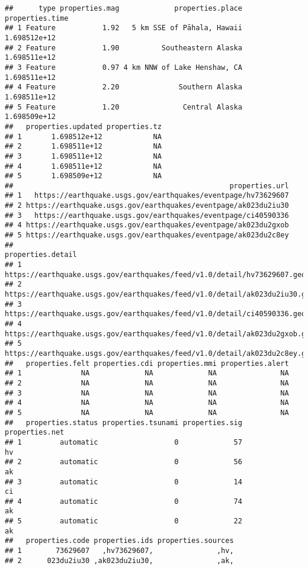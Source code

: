\documentclass[
]{article}
\begin{document}
\begin{verbatim}
##      type properties.mag             properties.place properties.time
## 1 Feature           1.92   5 km SSE of Pāhala, Hawaii    1.698512e+12
## 2 Feature           1.90          Southeastern Alaska    1.698511e+12
## 3 Feature           0.97 4 km NNW of Lake Henshaw, CA    1.698511e+12
## 4 Feature           2.20              Southern Alaska    1.698511e+12
## 5 Feature           1.20               Central Alaska    1.698509e+12
##   properties.updated properties.tz
## 1       1.698512e+12            NA
## 2       1.698511e+12            NA
## 3       1.698511e+12            NA
## 4       1.698511e+12            NA
## 5       1.698509e+12            NA
##                                                   properties.url
## 1   https://earthquake.usgs.gov/earthquakes/eventpage/hv73629607
## 2 https://earthquake.usgs.gov/earthquakes/eventpage/ak023du2iu30
## 3   https://earthquake.usgs.gov/earthquakes/eventpage/ci40590336
## 4 https://earthquake.usgs.gov/earthquakes/eventpage/ak023du2gxob
## 5 https://earthquake.usgs.gov/earthquakes/eventpage/ak023du2c8ey
##                                                               properties.detail
## 1   https://earthquake.usgs.gov/earthquakes/feed/v1.0/detail/hv73629607.geojson
## 2 https://earthquake.usgs.gov/earthquakes/feed/v1.0/detail/ak023du2iu30.geojson
## 3   https://earthquake.usgs.gov/earthquakes/feed/v1.0/detail/ci40590336.geojson
## 4 https://earthquake.usgs.gov/earthquakes/feed/v1.0/detail/ak023du2gxob.geojson
## 5 https://earthquake.usgs.gov/earthquakes/feed/v1.0/detail/ak023du2c8ey.geojson
##   properties.felt properties.cdi properties.mmi properties.alert
## 1              NA             NA             NA               NA
## 2              NA             NA             NA               NA
## 3              NA             NA             NA               NA
## 4              NA             NA             NA               NA
## 5              NA             NA             NA               NA
##   properties.status properties.tsunami properties.sig properties.net
## 1         automatic                  0             57             hv
## 2         automatic                  0             56             ak
## 3         automatic                  0             14             ci
## 4         automatic                  0             74             ak
## 5         automatic                  0             22             ak
##   properties.code properties.ids properties.sources
## 1        73629607   ,hv73629607,               ,hv,
## 2      023du2iu30 ,ak023du2iu30,               ,ak,

\end{verbatim}
\end{document}

